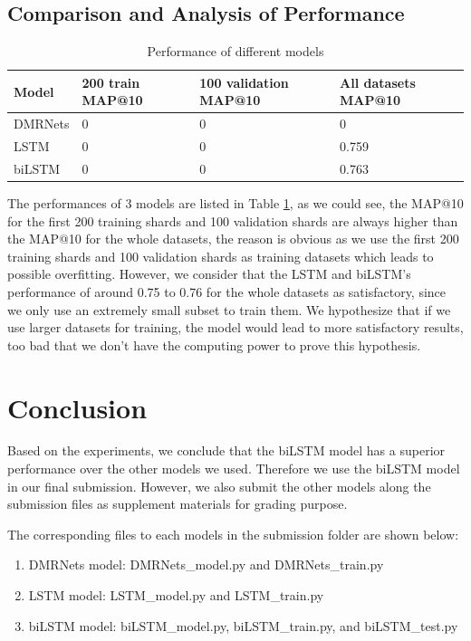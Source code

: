 \documentclass{article}
\begin{document}
\subsection{Comparison and Analysis of Performance}
\begin{table} [H]
  \caption{Performance of different models}
  \label{table 1}
  \centering
  \begin{tabular}{llll}
    \toprule
    Model     & 200 train MAP@10     & 100 validation MAP@10 & All datasets MAP@10 \\
    \midrule 
DMRNets & 0  & 0   &0  \\
LSTM & 0  & 0 & 0.759     \\
biLSTM     & 0 & 0 & 0.763      \\
    \bottomrule
  \end{tabular}
\end{table}
The performances of 3 models are listed in Table \ref{table 1}, as we could see, the MAP@10 for the first 200 training shards and 100 validation shards are always higher than the MAP@10 for the whole datasets, the reason is obvious as we use the first 200 training shards and 100 validation shards as training datasets which leads to possible overfitting. However, we consider that the LSTM and biLSTM's performance of around 0.75 to 0.76 for the whole datasets as satisfactory, since we only use an extremely small subset to train them. We hypothesize that if we use larger datasets for training, the model would lead to more satisfactory results, too bad that we don't have the computing power to prove this hypothesis.

\section{Conclusion}
Based on the experiments, we conclude that the biLSTM model has a superior performance over the other models we used. Therefore we use the biLSTM model in our final submission. However, we also submit the other models along the submission files as supplement materials for grading purpose.

The corresponding files to each models in the submission folder are shown below:
\begin{enumerate}
\item DMRNets model: DMRNets\_model.py and DMRNets\_train.py
\item LSTM model: LSTM\_model.py and LSTM\_train.py
\item biLSTM model: biLSTM\_model.py, biLSTM\_train.py, and biLSTM\_test.py
\end{enumerate}
\end{document}

